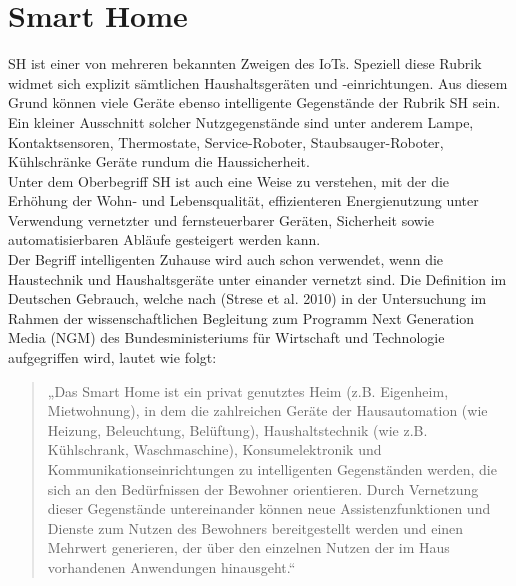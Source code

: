 \section{Smart Home}
\label{sec:smartHome}
\acl{SH} ist einer von mehreren bekannten Zweigen des \acs{IoT}s. Speziell diese Rubrik widmet sich explizit 
sämtlichen Haushaltsgeräten und -einrichtungen. Aus diesem Grund können viele Geräte ebenso intelligente Gegenstände 
der Rubrik \acl{SH} sein. Ein kleiner Ausschnitt solcher Nutzgegenstände sind unter anderem Lampe, Kontaktsensoren, 
Thermostate, Service-Roboter, Staubsauger-Roboter, Kühlschränke Geräte rundum die Haussicherheit. 
\\ 
Unter dem Oberbegriff \acl{SH} ist auch eine Weise zu verstehen, mit der die Erhöhung der Wohn- und Lebensqualität, 
effizienteren Energienutzung unter Verwendung vernetzter und fernsteuerbarer Geräten, Sicherheit sowie automatisierbaren 
Abläufe gesteigert werden kann. 
\\ 
Der Begriff intelligenten Zuhause wird auch schon verwendet, wenn die Haustechnik und Haushaltsgeräte unter einander  
vernetzt sind. Die Definition im Deutschen Gebrauch, welche nach (Strese et al. 2010) in der Untersuchung im Rahmen 
der wissenschaftlichen Begleitung zum Programm Next Generation Media (NGM) des Bundesministeriums für Wirtschaft und 
Technologie aufgegriffen wird, lautet wie folgt: 
\begin{quote}
    „Das Smart Home ist ein privat genutztes Heim (z.B. Eigenheim, Mietwohnung), in dem die zahlreichen Geräte der 
    Hausautomation (wie Heizung, Beleuchtung, Belüftung), Haushaltstechnik (wie z.B. Kühlschrank, Waschmaschine), 
    Konsumelektronik und Kommunikationseinrichtungen zu intelligenten Gegenständen werden, die sich an den 
    Bedürfnissen der Bewohner orientieren. Durch Vernetzung dieser Gegenstände untereinander können neue 
    Assistenzfunktionen und Dienste zum Nutzen des Bewohners bereitgestellt werden und einen Mehrwert 
    generieren, der über den einzelnen Nutzen der im Haus vorhandenen Anwendungen hinausgeht.“ \cite{strese.2010m}
\end{quote}

